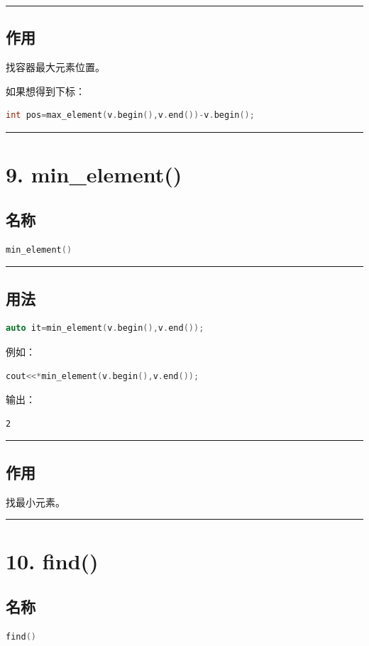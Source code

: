 \documentclass[10pt,twocolumn]{extarticle}
\begin{document}
\noindent\rule{\linewidth}{0.4pt}

\subsection{作用}
找容器最大元素位置。

如果想得到下标：
\begin{lstlisting}[language=C++]
int pos=max_element(v.begin(),v.end())-v.begin();
\end{lstlisting}

\noindent\rule{\linewidth}{0.4pt}

\section{9. min\_element()}

\subsection{名称}
\begin{lstlisting}[language=C++]
min_element()
\end{lstlisting}

\noindent\rule{\linewidth}{0.4pt}

\subsection{用法}
\begin{lstlisting}[language=C++]
auto it=min_element(v.begin(),v.end());
\end{lstlisting}
例如：
\begin{lstlisting}[language=C++]
cout<<*min_element(v.begin(),v.end());
\end{lstlisting}
输出：
\begin{lstlisting}
2
\end{lstlisting}

\noindent\rule{\linewidth}{0.4pt}

\subsection{作用}
找最小元素。

\noindent\rule{\linewidth}{0.4pt}

\section{10. find()}

\subsection{名称}
\begin{lstlisting}[language=C++]
find()
\end{lstlisting}
\end{document}
